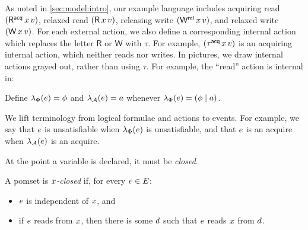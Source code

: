 As noted in \textsection\ref{sec:model:intro}, our example language includes acquiring
read $(\DRAcq{\aLoc}{\aVal})$, relaxed read $(\DR{\aLoc}{\aVal})$, releasing
write $(\DWRel{\aLoc}{\aVal})$, and relaxed write $(\DW{\aLoc}{\aVal})$.
For each external action, we also define a corresponding internal action
which replaces the letter $\mathsf{R}$ or $\mathsf{W}$ with $\tau$.
For example, $(\iDRAcq{\aLoc}{\aVal})$ is an acquiring internal action, which
neither reads nor writes. In pictures, we draw internal actions grayed out,
rather than using $\tau$.  For example, the ``read'' action is internal in:
\begin{tikzdisplay}[node distance=1em]
\end{tikzdisplay}





Define %
$\lambda_{\Phi}(e)=\phi$ and $\lambda_{\mathcal{A}}(e)=a$ whenever
$\lambda_{\Phi}(e)=(\phi\mid a)$.

We lift terminology from logical formulae and actions to events. For example,
we say that $e$ is unsatisfiable when $\lambda_{\Phi}(e)$ is unsatisfiable,
and that $e$ is an acquire when $\lambda_{\mathcal{A}}(e)$ is an acquire.




At the point a variable is declared, it must be \emph{closed}.
\begin{definition}
\label{def:x-closed}
  A pomset is \emph{$x$-closed} if, for every $e\in E$:
  \begin{itemize}
  \item $e$ is independent of $x$, and
  \item if $e$ reads from $x$, then there is some $d$ such that
    $e$ reads $x$ from $d$.
  \end{itemize}
\end{definition}

